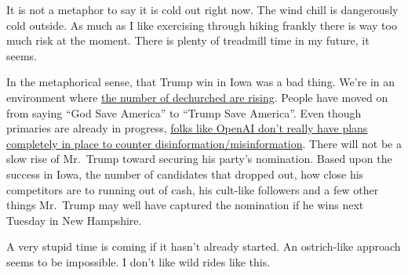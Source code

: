 It is not a metaphor to say it is cold out right now. The wind chill is
dangerously cold outside. As much as I like exercising through hiking
frankly there is way too much risk at the moment. There is plenty of
treadmill time in my future, it seems.

In the metaphorical sense, that Trump win in Iowa was a bad thing. We're
in an environment where
\href{https://julieroys.com/the-great-dechurching-explores-americas-religious-exodus/}{the
number of dechurched are rising}. People have moved on from saying ``God
Save America'' to ``Trump Save America''. Even though primaries are
already in progress,
\href{https://www.engadget.com/openai-lays-out-its-misinformation-strategy-ahead-of-2024-elections-022549912.html?src=rss}{folks
like OpenAI don't really have plans completely in place to counter
disinformation/misinformation}. There will not be a slow rise of
Mr.~Trump toward securing his party's nomination. Based upon the success
in Iowa, the number of candidates that dropped out, how close his
competitors are to running out of cash, his cult-like followers and a
few other things Mr.~Trump may well have captured the nomination if he
wins next Tuesday in New Hampshire.

A very stupid time is coming if it hasn't already started. An
ostrich-like approach seems to be impossible. I don't like wild rides
like this.
